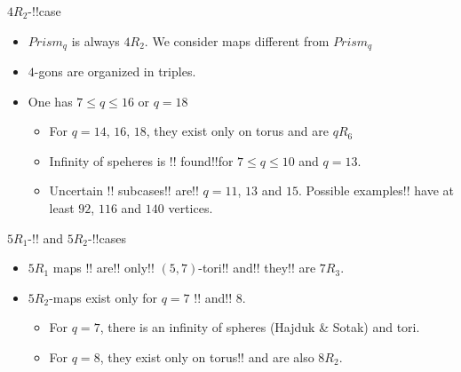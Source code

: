 \documentclass[%
pdf,
colorBG,
slideColor,
]{prosper}
\begin{document}
\begin{slide}{$4R_2$-!!case}
\begin{itemize}
\item $Prism_q$ is always $4R_2$. We consider maps different from $Prism_q$
\item $4$-gons are organized in triples.
\item One has $7\leq q\leq 16$ or $q=18$
\begin{itemize}
\item For $q=14$, $16$, $18$, they exist only on torus and are $qR_6$
\item Infinity of speheres is 
!!%
found!!for $7\leq q\leq 10$ and $q=13$.
\item Uncertain 
!!%
subcases!! are!! $q=11$, $13$ and $15$. Possible examples!! have
at least $92$, $116$ and $140$ vertices.
\end{itemize}
\end{itemize}

\end{slide}





\begin{slide}{$5R_1$-!! and $5R_2$-!!cases}
\begin{itemize}
\item $5R_1$ maps 
!!%
are!! only!! $(5,7)$-tori!! and!! they!! are $7R_3$.
\item $5R_2$-maps exist only for $q=7$ 
!!%
and!! $8$.
\begin{itemize}
\item For $q=7$, there is an infinity of spheres (Hajduk \& Sotak) and tori.
\begin{center}
\begin{minipage}{5.0cm}
\centering
{}\par
\end{minipage}
\begin{minipage}{5cm}
\centering
{}\par
\end{minipage}
\end{center}
\item For $q=8$, they exist only on torus!! and are also $8R_2$.
\end{itemize}

\end{itemize}

\end{slide}
\end{document}
